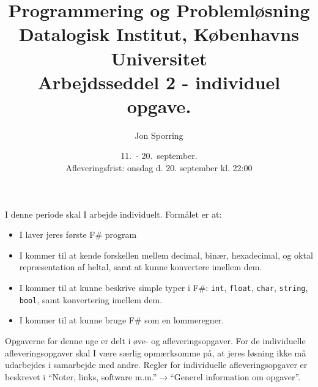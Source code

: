 \documentclass[a4paper,12pt]{article}
\title{Programmering og Problemløsning\\Datalogisk Institut,
  Københavns Universitet\\Arbejdsseddel 2 - individuel opgave.}
\author{Jon Sporring}
\date{11.\ - 20.\ september.\\Afleveringsfrist: onsdag d. 20. september kl. 22:00}
\begin{document}
\maketitle

I denne periode skal I arbejde individuelt. Formålet er at:
\begin{itemize}
\item I laver jeres første F\# program
\item I kommer til at kende forskellen mellem decimal, binær, hexadecimal, og oktal repræsentation af heltal, samt at kunne konvertere imellem dem.
\item I kommer til at kunne beskrive simple typer i F\#: \lstinline{int}, \lstinline{float}, \lstinline{char}, \lstinline{string}, \lstinline{bool}, samt konvertering imellem dem.
\item I kommer til at kunne bruge F\# som en lommeregner.
\end{itemize}

Opgaverne for denne uge er delt i øve- og afleveringsopgaver. For de individuelle afleveringsopgaver skal I være særlig opmærksomme på, at jeres løsning ikke må udarbejdes i samarbejde med andre. Regler for individuelle afleveringsopgaver er beskrevet i "`Noter, links, software m.m."'$\rightarrow$"`Generel information om opgaver"'.
\end{document}
